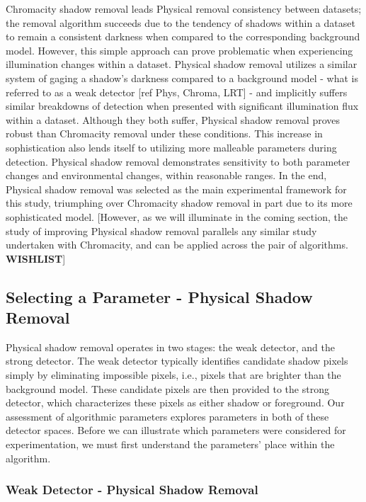 \documentclass[12pt]{report}
\begin{document}
Chromacity shadow removal leads Physical removal consistency between datasets; the removal algorithm succeeds due to the tendency of shadows within a dataset to remain a consistent darkness when compared to the corresponding background model. However, this simple approach can prove problematic when experiencing illumination changes within a dataset. Physical shadow removal utilizes a similar system of gaging a shadow's darkness compared to a background model - what is referred to as a weak detector [ref Phys, Chroma, LRT] - and implicitly suffers similar breakdowns of detection when presented with significant illumination flux within a dataset. Although they both suffer, Physical shadow removal proves robust than Chromacity removal under these conditions. This increase in sophistication also lends itself to utilizing more malleable parameters during detection. Physical shadow removal demonstrates sensitivity to both parameter changes and environmental changes, within reasonable ranges. In the end, Physical shadow removal was selected as the main experimental framework for this study, triumphing over Chromacity shadow removal in part due to its more sophisticated model. [However, as we will illuminate in the coming section, the study of improving Physical shadow removal parallels any similar study undertaken with Chromacity, and can be applied across the pair of algorithms. \textbf{WISHLIST}]

\subsection{Selecting a Parameter - Physical Shadow Removal} \label{section:selectparameter}

Physical shadow removal operates in two stages: the weak detector, and the strong detector. The weak detector typically identifies candidate shadow pixels simply by eliminating impossible pixels, i.e., pixels that are brighter than the background model. These candidate pixels are then provided to the strong detector, which characterizes these pixels as either shadow or foreground. Our assessment of algorithmic parameters explores parameters in both of these detector spaces. Before we can illustrate which parameters were considered for experimentation, we must first understand the parameters' place within the algorithm.

\subsubsection{Weak Detector - Physical Shadow Removal}
\end{document}

